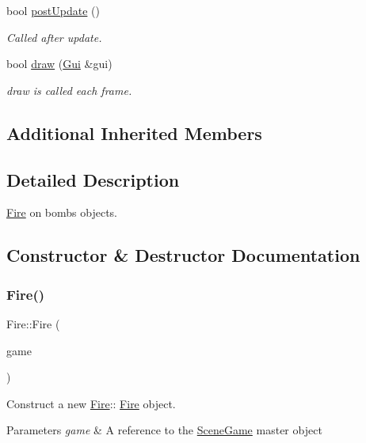\begin{DoxyCompactItemize}
bool \hyperlink{class_fire_adba3c7ec49ed7d31fd35250105a35edf}{post\+Update} ()
\begin{DoxyCompactList}\small\item\em Called after update. \end{DoxyCompactList}\item 
bool \hyperlink{class_fire_a622efdbee6254c463250b6d9033428eb}{draw} (\hyperlink{class_gui}{Gui} \&gui)
\begin{DoxyCompactList}\small\item\em draw is called each frame. \end{DoxyCompactList}\end{DoxyCompactItemize}
\subsection*{Additional Inherited Members}


\subsection{Detailed Description}
\hyperlink{class_fire}{Fire} on bombs objects. 

\subsection{Constructor \& Destructor Documentation}
\mbox{\label{class_fire_a04a8fa42a22f0e0adb7cb4bd6e8e678f}} 
\subsubsection{\texorpdfstring{Fire()}{Fire()}\hspace{0.1cm}{\footnotesize\ttfamily [1/2]}}
{\footnotesize\ttfamily Fire\+::\+Fire (\begin{DoxyParamCaption}\item[{\hyperlink{class_scene_game}{Scene\+Game} \&}]{game }\end{DoxyParamCaption})\hspace{0.3cm}{\ttfamily [explicit]}}



Construct a new \hyperlink{class_fire}{Fire}\+:\+: \hyperlink{class_fire}{Fire} object. 


\begin{DoxyParams}{Parameters}
{\em game} & A reference to the \hyperlink{class_scene_game}{Scene\+Game} master object \\
\hline
\end{DoxyParams}
\mbox{\label{class_fire_ace320f43896cb0ff375f688e7ee6aea6}} 
